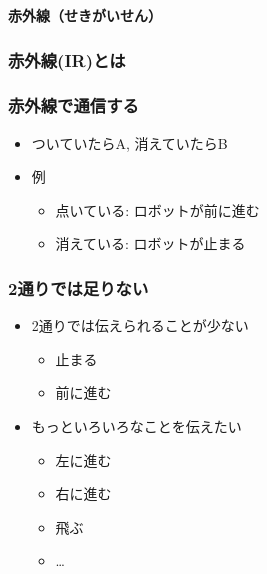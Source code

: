 \documentclass[slide05.tex]{subfiles}
\begin{document}
\begin{frame}[plain]
    \begin{center}
        \vspace{48pt}
        {\huge\bf 赤外線（せきがいせん）}
    \end{center}
\end{frame}

\begin{frame}[fragile]
    \frametitle{赤外線(IR)とは}
    \vspace{20pt}
    \begin{center}
        
    \end{center}
\end{frame}

\begin{frame}
    \frametitle{赤外線で通信する}
    \begin{itemize}
        \item ついていたらA, 消えていたらB
        \item 例
        \begin{itemize}
            \item 点いている: ロボットが前に進む
            \item 消えている: ロボットが止まる
        \end{itemize}
    \end{itemize}
\end{frame}

\begin{frame}
   \frametitle{2通りでは足りない} 
   \begin{itemize}
        \item 2通りでは伝えられることが少ない
        \begin{itemize}
            \item 止まる
            \item 前に進む
        \end{itemize}
        \item もっといろいろなことを伝えたい
        \begin{itemize}
            \item 左に進む
            \item 右に進む
            \item 飛ぶ
            \item \dots
        \end{itemize}
   \end{itemize}
\end{frame}
\end{document}
